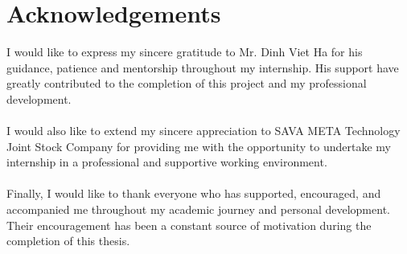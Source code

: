 \chapter*{Acknowledgements}

I would like to express my sincere gratitude to Mr. Dinh Viet Ha for his guidance, patience and mentorship throughout my internship. His support have greatly contributed to the completion of this project and my professional development.
\\
\\
I would also like to extend my sincere appreciation to SAVA META Technology Joint Stock Company for providing me with the opportunity to undertake my internship in a professional and supportive working environment.
\\
\\
Finally, I would like to thank everyone who has supported, encouraged, and accompanied me throughout my academic journey and personal development. Their encouragement has been a constant source of motivation during the completion of this thesis.

\clearpage